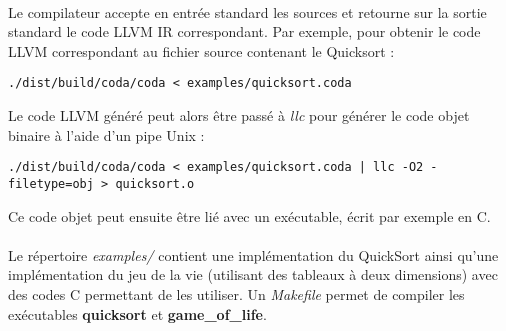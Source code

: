 \documentclass[a4paper]{article}
\begin{document}
    \paragraph{}Le compilateur accepte en entrée standard les sources et
retourne sur la sortie standard le code LLVM IR correspondant.
Par exemple, pour obtenir le code LLVM correspondant au fichier source contenant
le Quicksort :
    \begin{verbatim}
./dist/build/coda/coda < examples/quicksort.coda
    \end{verbatim}
Le code LLVM généré peut alors être passé à \textit{llc} pour
générer le code objet binaire à l'aide d'un pipe Unix :
    \begin{verbatim}
./dist/build/coda/coda < examples/quicksort.coda | llc -O2 -filetype=obj > quicksort.o
    \end{verbatim}
Ce code objet peut ensuite être lié avec un exécutable, écrit par exemple en C.

    \paragraph{}Le répertoire \textit{examples/} contient une implémentation du
QuickSort ainsi qu'une implémentation du jeu de la vie (utilisant des tableaux
à deux dimensions) avec des codes C permettant de les utiliser. Un
\textit{Makefile} permet de compiler les exécutables \textbf{quicksort} et
\textbf{game\_of\_life}.
\end{document}
